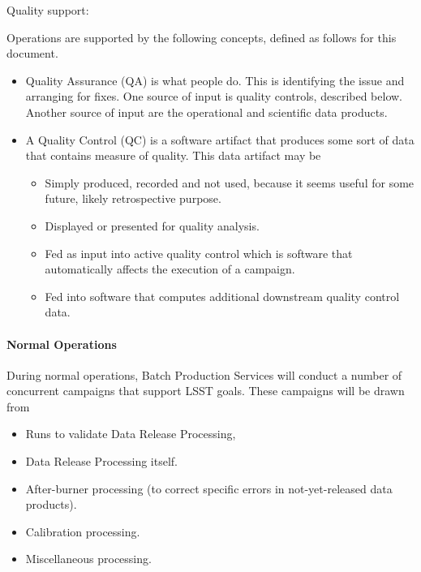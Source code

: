 Quality support:

Operations are supported by the following concepts, defined as follows for this 
document.

\begin{itemize}

\item Quality Assurance (QA) is what people do. This is identifying the issue 
and arranging for fixes. One source of input is quality controls, described 
below. Another source of input are the operational and scientific data products. 

\item A Quality Control (QC) is a software artifact that produces some sort of 
data that contains measure of quality. This data artifact may be

    \begin{itemize}

    \item Simply produced, recorded and not used, because it seems useful for 
    some future, likely retrospective purpose.

    \item Displayed or presented for quality analysis.

    \item Fed as input into active quality control which is software that 
    automatically affects the execution of a campaign.

    \item Fed into software that computes additional downstream quality control 
    data.

    \end{itemize}

\end{itemize}

\paragraph{Normal Operations}

During normal operations, Batch Production Services will conduct a number of 
concurrent campaigns that support LSST goals. These campaigns will be drawn from 

\begin{itemize}

\item Runs to validate Data Release Processing, 

\item Data Release Processing itself.

\item After-burner processing (to correct specific errors in not-yet-released 
data products).

\item Calibration processing.

\item Miscellaneous processing.

\end{itemize}

